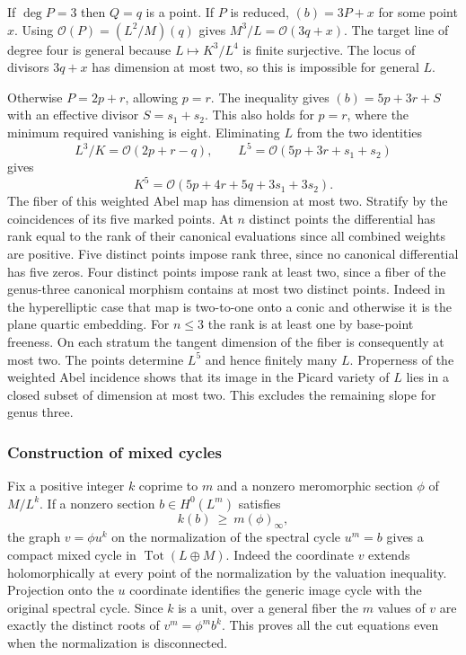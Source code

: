 If $\deg P=3$ then $Q=q$ is a point. If $P$ is reduced, $(b)=3P+x$ for some point $x$. Using $\mathcal O(P)=(L^2/M)(q)$ gives $M^3/L=\mathcal O(3q+x)$. The target line of degree four is general because $L\mapsto K^3/L^4$ is finite surjective. The locus of divisors $3q+x$ has dimension at most two, so this is impossible for general $L$.

Otherwise $P=2p+r$, allowing $p=r$. The inequality gives $(b)=5p+3r+S$ with an effective divisor $S=s_1+s_2$. This also holds for $p=r$, where the minimum required vanishing is eight. Eliminating $L$ from the two identities
\[
 L^3/K=\mathcal O(2p+r-q),\qquad L^5=\mathcal O(5p+3r+s_1+s_2)
\]
gives
\[
 K^5=\mathcal O(5p+4r+5q+3s_1+3s_2).
\]
The fiber of this weighted Abel map has dimension at most two. Stratify by the coincidences of its five marked points. At $n$ distinct points the differential has rank equal to the rank of their canonical evaluations since all combined weights are positive. Five distinct points impose rank three, since no canonical differential has five zeros. Four distinct points impose rank at least two, since a fiber of the genus-three canonical morphism contains at most two distinct points. Indeed in the hyperelliptic case that map is two-to-one onto a conic and otherwise it is the plane quartic embedding. For $n\le3$ the rank is at least one by base-point freeness. On each stratum the tangent dimension of the fiber is consequently at most two. The points determine $L^5$ and hence finitely many $L$. Properness of the weighted Abel incidence shows that its image in the Picard variety of $L$ lies in a closed subset of dimension at most two. This excludes the remaining slope for genus three.

\subsubsection{Construction of mixed cycles}

Fix a positive integer $k$ coprime to $m$ and a nonzero meromorphic section $\phi$ of $M/L^k$. If a nonzero section $b\in H^0(L^m)$ satisfies
\[
 k(b)\ \ge\ m(\phi)_\infty ,
\]
the graph $v=\phi u^k$ on the normalization of the spectral cycle $u^m=b$ gives a compact mixed cycle in $\operatorname{Tot}(L\oplus M)$. Indeed the coordinate $v$ extends holomorphically at every point of the normalization by the valuation inequality. Projection onto the $u$ coordinate identifies the generic image cycle with the original spectral cycle. Since $k$ is a unit, over a general fiber the $m$ values of $v$ are exactly the distinct roots of $v^m=\phi^m b^k$. This proves all the cut equations even when the normalization is disconnected.

